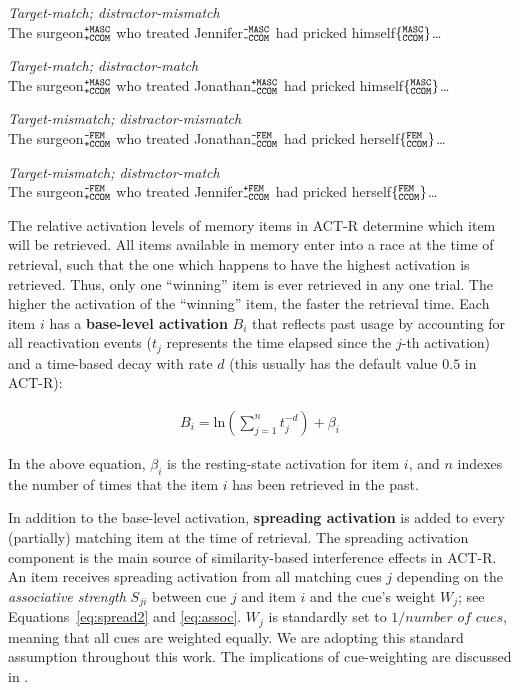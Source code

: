 \documentclass{cambridge7A}\usepackage[]{graphicx}\usepackage[]{color}
\newcommand{\featureset}[2]{$\{^{\texttt{\uppercase{#1}}}_{\texttt{\uppercase{#2}}}\}$}
\newcommand{\featuresetNP}[2]{$^{\texttt{\uppercase{#1}}}_{\texttt{\uppercase{#2}}}$}
\begin{document}
\begin{exe}
\ex\label{ex:c03sturt03:exp2}
\begin{xlist}
\item \textit{Target-match; distractor-mismatch}\\
The surgeon\featuresetNP{+MASC}{+CCOM} who treated Jennifer\featuresetNP{-MASC}{-CCOM} had pricked himself\featureset{MASC}{CCOM}\dots
\item \textit{Target-match; distractor-match}\\
The surgeon\featuresetNP{+MASC}{+CCOM} who treated Jonathan\featuresetNP{+MASC}{-CCOM} had pricked himself\featureset{MASC}{CCOM}\dots
\item \textit{Target-mismatch; distractor-mismatch}\\
The surgeon\featuresetNP{-FEM}{+CCOM} who treated Jonathan\featuresetNP{-FEM}{-CCOM} had pricked herself\featureset{FEM}{CCOM}\dots
\item \textit{Target-mismatch; distractor-match}\\
The surgeon\featuresetNP{-FEM}{+CCOM} who treated Jennifer\featuresetNP{+FEM}{-CCOM} had pricked herself\featureset{FEM}{CCOM}\dots
\end{xlist}
\end{exe}


The relative activation levels of memory items in ACT-R determine which item will be retrieved. All items available in memory enter into a race at the time of retrieval, such that the one which happens to have the highest activation is retrieved. Thus, only one ``winning'' item is ever retrieved in any one trial. The higher the activation of the ``winning'' item, the faster the retrieval time.  Each item $i$ has a  \textbf{base-level activation} $B_i$  that reflects past usage by accounting for all reactivation events ($t_j$ represents the time elapsed since the $j$-th activation) and a time-based decay with rate $d$ (this usually has the default value $0.5$ in ACT-R):

\begin{eqnarray}
  B_i = \text{ln}(\sum_{j=1}^n t_j^{-d}) + \beta_i \label{eq:bl}
\end{eqnarray}

\noindent
In the above equation, $\beta_i$ is the resting-state activation for item $i$, and $n$ indexes the number of times that the item $i$ has been retrieved in the past.

In addition to the base-level activation,  \textbf{spreading activation} is added to every (partially) matching item at the time of retrieval. The spreading activation component is the main source of similarity-based interference effects in ACT-R. 
An item receives spreading activation from all matching cues $j$ depending on the  \emph{associative strength} $S_{ji}$ between cue $j$ and item $i$ and the cue's weight $W_{j}$; see Equations~\ref{eq:spread2} and \ref{eq:assoc}. $W_j$ is standardly set to $1/\textit{number of cues}$, meaning that all cues are weighted equally. We are adopting this standard assumption throughout this work.  The implications of cue-weighting are discussed in \citep{VasishthEtAlTiCS2019,JaegerMertzenVanDykeVasishth2019}. 
\end{document}
